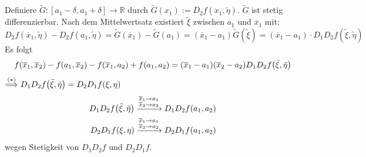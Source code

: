 Definiere $\tilde G : [a_1 - \delta , a_1 + \delta ]\to \mathds{R}$ durch $\tilde G(x_1) := D_2 f(x_1, \tilde \eta)$. $\tilde G$ ist stetig differenzierbar. Nach dem 
Mittelwertsatz existiert $\tilde \xi$ zwischen $a_1$ und $\overline{x}_1 $ mit:
\[
	D_2 f(\overline{x}_1 , \tilde \eta ) - D_2 f(a_1, \tilde \eta)= \tilde G (\overline{x}_1 ) - \tilde G(a_1) = (\overline{x}_1 -a_1 )  \tilde G \left( \tilde \xi \right)
	= (\overline{x}_1 - a_1 ) \cdot D_1 D_2 f \left(\tilde \xi, \tilde \eta \right)
\]
Es folgt 
\[
	f(\overline{x}_1, \overline{x}_2  ) - f (a_1, \overline{x}_2 ) - f(\overline{x}_1, a_2 ) + f(a_1, a_2) = (\overline{x}_1 - a_1 ) ( \overline{x}_2 -a_2 ) D_1 D_2 f
	\enbrace*{\tilde \xi , \tilde \eta} 
\]
$\stackrel{(\star)}{\Longrightarrow}   D_1 D_2 f \enbrace*{\tilde \xi, \tilde \eta} = D_2 D_1 f( \xi, \eta) $
\begin{align*}
	D_1 D_2 f \enbrace*{\tilde \xi, \tilde \eta} &\xrightarrow{\substack{\overline{x}_1 \to a_1 \\ \overline{x}_2  \to a_2  }} D_1 D_2 f(a_1, a_2) \\
	D_2 D_1 f( \xi, \eta) &\xrightarrow{\substack{\overline{x}_1 \to a_1 \\ \overline{x}_2  \to a_2  }} D_2 D_1 f(a_1, a_2)
\end{align*}
wegen Stetigkeit von $D_1 D_2 f$ und $D_2 D_1 f$. \bewende 


